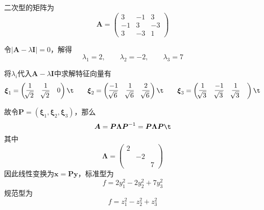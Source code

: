 二次型的矩阵为\[\boldsymbol{A} = \begin{pmatrix}
    3 & -1 & 3 \\ -1 & 3 & -3 \\ 3 & -3 & 1
\end{pmatrix}\]

令\(|\boldsymbol{A} - \lambda\boldsymbol{I}| = 0\)，解得\[\lambda_1 = 2,\qquad\lambda_2 = -2,\qquad\lambda_3 = 7\]

将\(\lambda_i\)代入\(\boldsymbol{A} - \lambda\boldsymbol{I}\)中求解特征向量有\[\boldsymbol{\xi}_1 = \begin{pmatrix}
    \displaystyle \frac{1}{\sqrt[]{2}} & \displaystyle\frac{1}{\sqrt[]{2}}&0
\end{pmatrix}\t \qquad\boldsymbol{\xi}_2 = \begin{pmatrix}
    \displaystyle\frac{-1}{\sqrt[]{6}} &\displaystyle\frac{1}{\sqrt[]{6}}&\displaystyle\frac{2}{\sqrt[]{6}}
\end{pmatrix}\t \qquad\boldsymbol{\xi}_3 = \begin{pmatrix}
    \displaystyle\frac{1}{\sqrt[]{3}} &\displaystyle\frac{-1}{\sqrt[]{3}} &\displaystyle\frac{1}{\sqrt[]{3}} &
\end{pmatrix}\t\]

故令\(\boldsymbol{P} = (\boldsymbol{\xi}_1, \boldsymbol{\xi}_2, \boldsymbol{\xi}_3)\)，那么\[\boldsymbol{A} = \boldsymbol{P\Lambda P}^{-1} = \boldsymbol{P\Lambda P}\t\]
其中\[\boldsymbol{\Lambda} = \begin{pmatrix}
    2 & & \\ & -2 & \\ & & 7
\end{pmatrix}\]
因此线性变换为\(\boldsymbol{x} = \boldsymbol{Py}\)，标准型为\[f = 2y_1^2 - 2y_2^2 + 7y_3^2\]
规范型为\[f = z_1^2 - z_2^2 + z_3^2\]